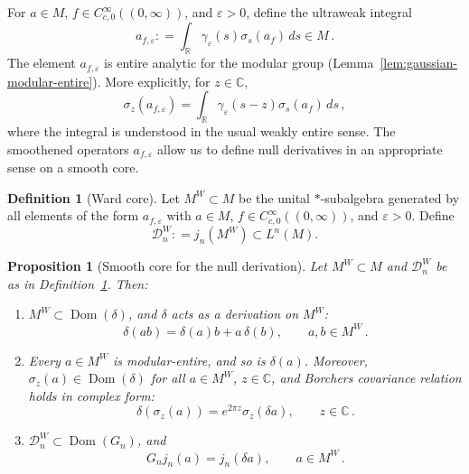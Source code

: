 \documentclass[11pt,a4paper]{article}
\theoremstyle{plain}
\numberwithin{theorem}{section}
\newtheorem{proposition}[theorem]{Proposition}
\theoremstyle{definition}
\newtheorem{definition}[theorem]{Definition}
\newcommand{\?}{\overset{?}{=}}
\newcommand{\defeq}{\mathrel{\mathop:}=}
\newcommand{\cD}{\mathcal{D}}
\DeclareMathOperator{\Dom}{Dom}
\begin{document}
For $a\in M$, $f\in C_{c,0}^\infty((0,\infty))$, and $\varepsilon>0$, define the ultraweak integral
\begin{equation}\label{eq:defn-double-smearing}
  a_{f,\varepsilon}\defeq \int_{\mathbb R}\gamma_\varepsilon(s)\sigma_s(a_f)\,ds\in M\,.
\end{equation} 
The element $a_{f,\varepsilon}$ is entire analytic for the modular group (Lemma~\ref{lem:gaussian-modular-entire}).  More explicitly, for $z\in\mathbb C$,
\begin{equation}
  \sigma_z(a_{f,\varepsilon})
  =\int_{\mathbb R}\gamma_\varepsilon(s-z)\sigma_s(a_f)\,ds\,,
\end{equation}
where the integral is understood in the usual weakly entire sense. The smoothened operators $a_{f,\varepsilon}$ allow us to define null derivatives in an appropriate sense on a smooth core.
\begin{definition}[Ward core]\label{def:smooth-core-null}
    Let $M^W\subset M$ %
    be the unital $*$-subalgebra generated by all elements of the form $a_{f,\varepsilon}$ with $a\in M$, $f\in C_{c,0}^\infty((0,\infty))$, and $\varepsilon>0$. Define
    \[
        \cD_n^{W}\defeq j_n(M^W)\subset L^n(M).
    \]
\end{definition}
\begin{proposition}[Smooth core for the null derivation]
\label{lem:smooth-core-delta}
Let $M^W\subset M$ and  $\cD_n^{W}$ be as in Definition~\ref{def:smooth-core-null}.  Then:
\begin{enumerate}
  \item[(i)] $M^W\subset\Dom(\delta)$, and $\delta$ acts as a derivation on $M^W$:
  \begin{equation}
  \label{eq:delta-derivation}
    \delta(ab)=\delta(a)b+a\,\delta(b),\qquad a,b\in M^W\,.
  \end{equation}
  \item[(ii)] Every $a\in M^W$ is modular-entire, and so is $\delta (a)$. Moreover, $\sigma_z(a)\in \Dom(\delta)$ for all $a\in M^W$, $z\in \mathbb C$, and Borchers covariance relation holds in complex form:
  \begin{equation}
  \label{eq:complex-borchers}
    \delta(\sigma_z(a))=e^{2\pi z}\sigma_z(\delta a),\qquad z\in\mathbb C\,.
  \end{equation}
  \item[(iii)] $\cD_n^{W}\subset\Dom(G_n)$, and
  \begin{equation}
  \label{eq:Gn-on-core}
    G_nj_n(a)=j_n(\delta a),\qquad a\in M^W\,.
  \end{equation}
\end{enumerate}
\end{proposition}
\end{document}

